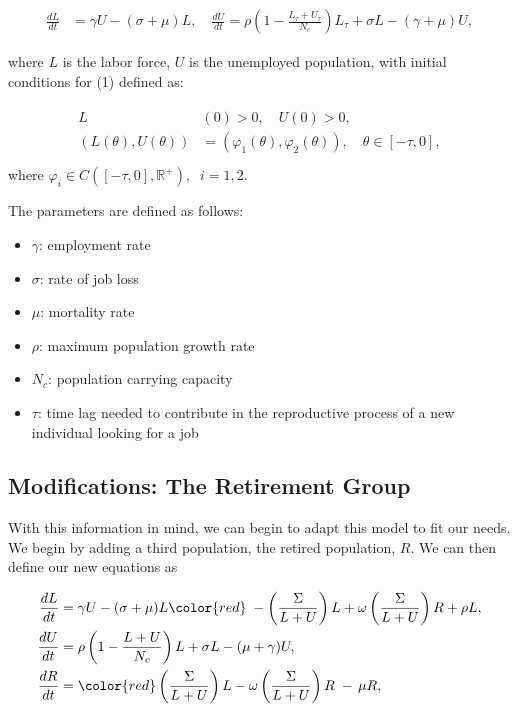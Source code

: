 \documentclass[11pt]{amsart}
\begin{document}
\begin{align}
    \frac{dL}{dt} &= \gamma U - (\sigma + \mu)L, \quad \frac{dU}{dt} = \rho \left(1 - \frac{L_{\tau} + U_{\tau}}{N_c} \right)L_{\tau} + \sigma L - (\gamma + \mu)U,
\end{align}

where $L$ is the labor force, $U$ is the unemployed population, with initial conditions for (1) defined as:

\begin{align}
    \begin{split}
        L&(0) > 0, \quad U(0) > 0, \\
        (L(\theta),U(\theta)) &= (\varphi_1(\theta), \varphi_2(\theta)), \quad \theta \in [-\tau,0], \\
    \end{split}
\end{align}
where $\varphi_i\in C([-\tau, 0], \mathbb{R}^+),\;\; i=1,2$.

The parameters are defined as follows:

\begin{itemize}
    \item $\gamma$: employment rate
    \item $\sigma$: rate of job loss 
    \item $\mu$: mortality rate
    \item $\rho$: maximum population growth rate 
    \item $N_c$: population carrying capacity 
    \item $\tau$: time lag needed to contribute in the reproductive process of a new individual looking for a job
\end{itemize}

\subsection{Modifications: The Retirement Group}
 

With this information in mind, we can begin to adapt this model to fit our needs. We begin by adding a third population, the retired population, $R$.
We can then define our new equations as

\begin{align}
    \begin{split}
        \frac{dL}{dt} &= \gamma U - (\sigma + \mu)L {\color{red}\;- \left(\frac{\Sigma}{L + U}\right) L + \omega\left(\frac{\Sigma}{L + U}\right) R + \rho L},\\
        \frac{dU}{dt} &= \rho\left(1 - \frac{L + U}{N_c} \right)L + \sigma L -(\mu + \gamma)U,  \\
        \frac{dR}{dt} &= {\color{red}\left(\frac{\Sigma}{L + U}\right) L - \omega\left(\frac{\Sigma}{L + U}\right) R \; - \, \mu R},
    \end{split}
\end{align}
\end{document}
